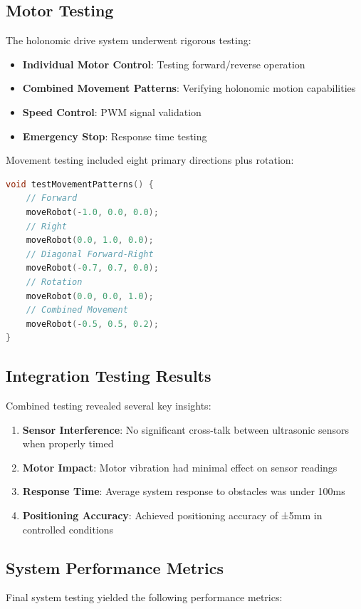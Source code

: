 \documentclass{article}
\begin{document}
\subsection{Motor Testing}
The holonomic drive system underwent rigorous testing:

\begin{itemize}
    \item \textbf{Individual Motor Control}: Testing forward/reverse operation
    \item \textbf{Combined Movement Patterns}: Verifying holonomic motion capabilities
    \item \textbf{Speed Control}: PWM signal validation
    \item \textbf{Emergency Stop}: Response time testing
\end{itemize}

Movement testing included eight primary directions plus rotation:

\begin{lstlisting}[language=C, basicstyle=\ttfamily\footnotesize, frame=single]
void testMovementPatterns() {
    // Forward
    moveRobot(-1.0, 0.0, 0.0);
    // Right
    moveRobot(0.0, 1.0, 0.0);
    // Diagonal Forward-Right
    moveRobot(-0.7, 0.7, 0.0);
    // Rotation
    moveRobot(0.0, 0.0, 1.0);
    // Combined Movement
    moveRobot(-0.5, 0.5, 0.2);
}
\end{lstlisting}

\subsection{Integration Testing Results}
Combined testing revealed several key insights:

\begin{enumerate}
    \item \textbf{Sensor Interference}: No significant cross-talk between ultrasonic sensors when properly timed
    \item \textbf{Motor Impact}: Motor vibration had minimal effect on sensor readings
    \item \textbf{Response Time}: Average system response to obstacles was under 100ms
    \item \textbf{Positioning Accuracy}: Achieved positioning accuracy of ±5mm in controlled conditions
\end{enumerate}

\subsection{System Performance Metrics}
Final system testing yielded the following performance metrics:
\end{document}
